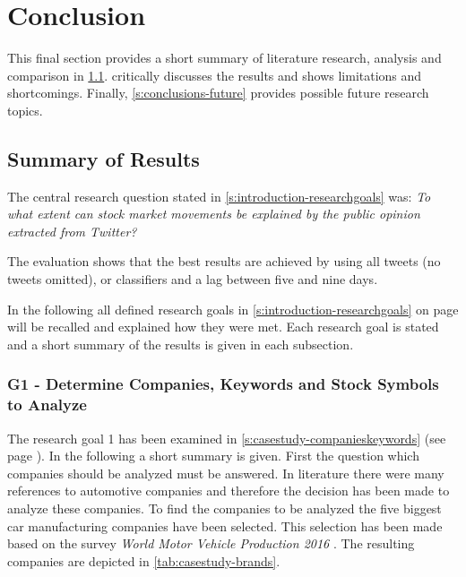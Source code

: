 
\chapter{Conclusion}
\label{c:conclusion}

This final section provides a short summary of literature research, analysis and comparison in \cref{s:conclusions-summary}.
 critically discusses the results and shows limitations and shortcomings. 
Finally, \cref{s:conclusions-future} provides possible future research topics.

\section{Summary of Results}
\label{s:conclusions-summary}

The central research question stated in \cref{s:introduction-researchgoals} was: \emph{To what extent can stock market movements be explained by the public opinion extracted from Twitter?}

The evaluation shows that the best results are achieved by using all tweets (no tweets omitted), \svm{} or \nb{} classifiers and a lag between five and nine days.

In the following all defined research goals in \cref{s:introduction-researchgoals} on page \pageref{s:introduction-researchgoals} will be recalled and explained how they were met.
Each research goal is stated and a short summary of the results is given in each subsection.


\subsection{G1 - Determine Companies, Keywords and Stock Symbols to Analyze}
\label{ss:conclusion-summary-g1}


The research goal 1 has been examined in \cref{s:casestudy-companieskeywords} (see page \pageref{s:casestudy-companieskeywords}).
In the following a short summary is given.
First the question which companies should be analyzed must be answered.
In literature there were many references to automotive companies and therefore the decision has been made to analyze these companies.
To find the companies to be analyzed the five biggest car manufacturing companies have been selected.
This selection has been made based on the survey \emph{World Motor Vehicle Production 2016} \citep{OICA2016}. 
The resulting companies are depicted in \cref{tab:casestudy-brands}.

